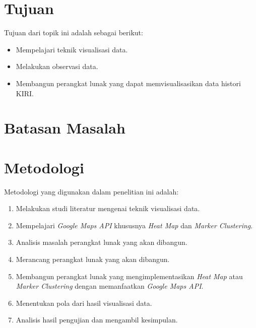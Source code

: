 \section{Tujuan}
\label{sec:tujuan}
Tujuan dari topik ini adalah sebagai berikut:
\begin{itemize}
  \item Mempelajari teknik visualisasi data.
  \item Melakukan observasi data.
  \item Membangun perangkat lunak yang dapat memvisualisasikan data histori KIRI.

\end{itemize}

\section{Batasan Masalah}
\label{sec:batasan}

\section{Metodologi}
\label{sec:metlit}
Metodologi yang digunakan dalam penelitian ini adalah:
	\begin{enumerate}
		\item Melakukan studi literatur mengenai teknik visualisasi data.
		\item Mempelajari \textit{Google Maps API} khususnya \textit{Heat Map} dan \textit{Marker Clustering}.
		\item Analisis masalah perangkat lunak yang akan dibangun.
		\item Merancang perangkat lunak yang akan dibangun.
		\item Membangun perangkat lunak yang mengimplementasikan \textit{Heat Map} atau \textit{Marker Clustering} dengan memanfaatkan \textit{Google Maps API}.
		\item Menentukan pola dari hasil visualisasi data.
		\item Analisis hasil pengujian dan mengambil kesimpulan.
	\end{enumerate}


